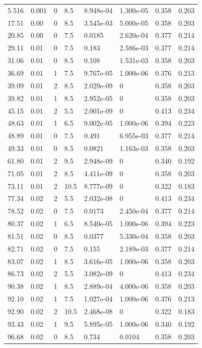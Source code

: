 \documentclass[preview]{standalone}
\begin{document}
{{\begin{tabular}{L{1.2cm}C{1.2cm} C{0.3cm}C{0.5cm} C{1.4cm}C{1.4cm} C{1.4cm}C{1.4cm}}
  5.516  &  0.001  & 0     & 8.5 &  8.948e-04  & 1.300e-05  & 0.358 &  0.203   \\ 
  17.51  &  0.00  & 0     & 8.5 &  3.545e-03  & 5.000e-05  & 0.358 &  0.203   \\ 
  20.85  &  0.00  & 0     & 7.5 &  0.0185  & 2.620e-04  & 0.377 &  0.214   \\ 
  29.11  &  0.01  & 0     & 7.5 &  0.183  & 2.586e-03  & 0.377 &  0.214   \\ 
  31.06  &  0.01  & 0     & 8.5 &  0.108  & 1.531e-03  & 0.358 &  0.203   \\ 
  36.69  &  0.01  & 1     & 7.5 &  9.767e-05  & 1.000e-06  & 0.376 &  0.213   \\ 
  39.09  &  0.01  & 2     & 8.5 &  2.029e-09  & 0  & 0.358 &  0.203   \\ 
  39.82  &  0.01  & 1     & 8.5 &  2.952e-05  & 0  & 0.358 &  0.203   \\ 
  45.15  &  0.01  & 2     & 5.5 &  2.001e-09  & 0  & 0.413 &  0.234   \\ 
  48.63  &  0.01  & 1     & 6.5 &  9.002e-05  & 1.000e-06  & 0.394 &  0.223   \\ 
  48.89  &  0.01  & 0     & 7.5 &  0.491  & 6.955e-03  & 0.377 &  0.214   \\ 
  49.33  &  0.01  & 0     & 8.5 &  0.0821  & 1.163e-03  & 0.358 &  0.203   \\ 
  61.80  &  0.01  & 2     & 9.5 &  2.948e-09  & 0  & 0.340 &  0.192   \\ 
  71.05  &  0.01  & 2     & 8.5 &  4.411e-09  & 0  & 0.358 &  0.203   \\ 
  73.11  &  0.01  & 2     & 10.5 &  8.777e-09  & 0  & 0.322 &  0.183   \\ 
  77.34  &  0.02  & 2     & 5.5 &  2.032e-08  & 0  & 0.413 &  0.234   \\ 
  78.52  &  0.02  & 0     & 7.5 &  0.0173  & 2.450e-04  & 0.377 &  0.214   \\ 
  80.37  &  0.02  & 1     & 6.5 &  8.540e-05  & 1.000e-06  & 0.394 &  0.223   \\ 
  81.51  &  0.02  & 0     & 8.5 &  0.0377  & 5.330e-04  & 0.358 &  0.203   \\ 
  82.71  &  0.02  & 0     & 7.5 &  0.155  & 2.189e-03  & 0.377 &  0.214   \\ 
  83.07  &  0.02  & 1     & 8.5 &  3.616e-05  & 1.000e-06  & 0.358 &  0.203   \\ 
  86.73  &  0.02  & 2     & 5.5 &  3.082e-09  & 0  & 0.413 &  0.234   \\ 
  90.38  &  0.02  & 1     & 8.5 &  2.889e-04  & 4.000e-06  & 0.358 &  0.203   \\ 
  92.10  &  0.02  & 1     & 7.5 &  1.027e-04  & 1.000e-06  & 0.376 &  0.213   \\ 
  92.90  &  0.02  & 2     & 10.5 &  2.468e-08  & 0  & 0.322 &  0.183   \\ 
  93.43  &  0.02  & 1     & 9.5 &  5.895e-05  & 1.000e-06  & 0.340 &  0.192   \\ 
  96.68  &  0.02  & 0     & 8.5 &  0.734  & 0.0104  & 0.358 &  0.203   \\ 
\hline 
\end{tabular} 

}}
\end{document}
